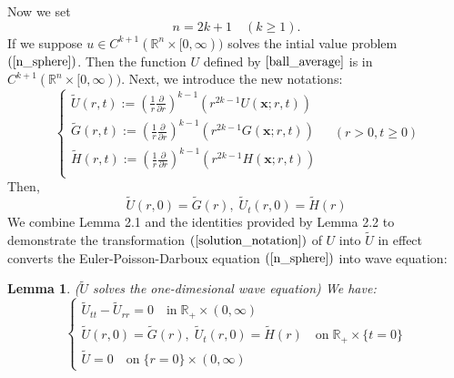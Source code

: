 \documentclass[10pt]{article}
\def\rr{{\mathbb R}}
\def\vc{{\mathbf x}}
\newtheorem{lemma}{Lemma}[section]
\begin{document}
Now we set
$$
n = 2k+1 \quad (k\geq 1). 
$$
If we suppose $u \in C^{k+1}(\rr^n \times [0,\infty))$ solves the intial value problem $(\ref{n_sphere})$. Then the function $U$ defined by $\ref{ball_average}$ is in $C^{k+1}(\rr^n \times [0,\infty))$. Next, we introduce the new notations:
\begin{equation}
    \label{solution_notation}
    \begin{cases}
        \tilde{U}(r,t) := \left(\frac{1}{r}\frac{\partial}{\partial r}\right)^{k-1}(r^{2k-1}U(\vc;r,t))\\
        \tilde{G}(r,t) := \left(\frac{1}{r}\frac{\partial}{\partial r}\right)^{k-1}(r^{2k-1}G(\vc;r,t))\\
        \tilde{H}(r,t) := \left(\frac{1}{r}\frac{\partial}{\partial r}\right)^{k-1}(r^{2k-1}H(\vc;r,t))\\
    \end{cases}\quad (r>0,t\geq0)
\end{equation}
Then,
\begin{equation}
    \label{solution_initial}
    \tilde{U}(r,0) = \tilde{G}(r), \; \tilde{U}_t(r,0) = \tilde{H}(r)
\end{equation}
We combine Lemma 2.1 and the identities provided by Lemma 2.2 to demonstrate the transformation $(\ref{solution_notation})$ of $U$ into $\tilde{U}$ in effect converts the Euler-Poisson-Darboux equation $(\ref{n_sphere})$ into wave equation:
\begin{lemma}($\tilde{U}$ solves the one-dimesional wave equation) We have:
    \begin{equation*}
        \begin{cases}
            \tilde{U}_{tt} - \tilde{U}_{rr} = 0 \quad \text{in} \;\rr_+\times(0,\infty)\\
            \tilde{U}(r,0) = \tilde{G}(r), \; \tilde{U}_t(r,0) = \tilde{H}(r) \quad \text{on} \;\rr_+\times\{t=0\}\\
            \tilde{U} = 0 \quad \text{on} \;\{r=0\}\times(0,\infty)
        \end{cases}
    \end{equation*}
\end{lemma}
\end{document}
